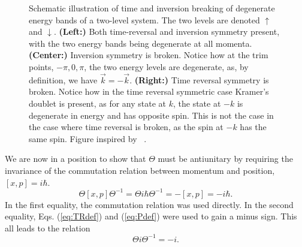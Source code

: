 \begin{figure}[h]
  \caption{Schematic illustration of time and inversion breaking of degenerate energy bands of a two-level system.
    The  two levels are denoted $\uparrow$ and $\downarrow$.
    \textbf{(Left:)} Both time-reversal and inversion symmetry present, with the two energy bands being degenerate at all momenta.
    \textbf{(Center:)} Inversion symmetry is broken. Notice how at the \gls{trim} points, $-\pi, 0, \pi$, the two energy levels are degenerate, as, by definition, we have $\vec{k} = -\vec{k}$.
    \textbf{(Right:)} Time reversal symmetry is broken.
    Notice how in the time reversal symmetric case Kramer's doublet is present, as for any state at $k$, the state at $-k$ is degenerate  in energy and has opposite spin.
    This is not the case in the case where time reversal is broken, as the spin at  $-k$ has the same spin.
    Figure inspired by \citeauthor{ramazashviliZeemanSpinorbitCoupling2019}~\cite{ramazashviliZeemanSpinorbitCoupling2019}.
  }
  \label{fig:symmetry_considerations}
\end{figure}

We are now in a position to show that $\Theta$ must be antiunitary by requiring the invariance of the commutation relation between momentum and position, $[x, p] = i\hbar$.
\begin{equation}
  \Theta [x, p] \Theta^{-1} = \Theta i\hbar \Theta^{-1} = - [x, p] = -i\hbar.
\end{equation}
In the first equality, the commutation relation was used directly.
In the second equality, Eqs. (\ref{eq:TRdef}) and (\ref{eq:Pdef}) were used to gain a minus sign.
This all leads to the relation
\begin{equation}
  \Theta i \Theta^{-1} = -i.
\end{equation}

